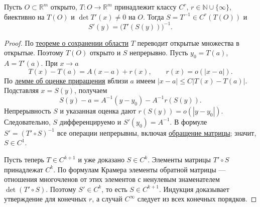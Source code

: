 \label{ticket:16}

\begin{theorem}
Пусть $O\subset\mathbb R^m$ открыто, $T:O\to\mathbb R^m$ принадлежит классу $C^r$, $r\in\mathbb N\cup\{\infty\}$, биективно на $T(O)$ и $\det T'(x)\ne0$ на $O$.
Тогда $S=T^{-1}\in C^r(T(O))$ и
\[
  S'(y)=\bigl(T'(S(y))\bigr)^{-1}.
\]
\end{theorem}

\begin{proof}
По \hyperref[ticket:14]{теореме о сохранении области} $T$ переводит открытые множества в открытые.
Поэтому $T(O)$ открыто и $S$ непрерывно.
Пусть $y_0=T(a)$, $A=T'(a)$.
При $x\to a$
\[
  T(x)-T(a)=A(x-a)+r(x),\qquad r(x)=o(|x-a|).
\]
По \hyperref[ticket:13]{лемме об оценке приращения} вблизи $a$ имеем $|x-a|\le C|T(x)-T(a)|$.
Подставляя $x=S(y)$, получаем
\[
  S(y)-a=A^{-1}(y-y_0)-A^{-1}r(S(y)).
\]
Непрерывность $S$ и указанная оценка дают $r(S(y))=o(|y-y_0|)$.
Следовательно, $S$ дифференцируемо и $S'(y_0)=A^{-1}$.
В формуле $S'=(T'\circ S)^{-1}$ все операции непрерывны, включая \hyperref[ticket:08]{обращение матрицы}; значит, $S\in C^1$.

Пусть теперь $T\in C^{k+1}$ и уже доказано $S\in C^k$.
Элементы матрицы $T'\circ S$ принадлежат $C^k$.
По формулам Крамера элементы обратной матрицы --- отношения многочленов от этих элементов с ненулевым знаменателем $\det(T'\circ S)$.
Поэтому $S'\in C^k$, то есть $S\in C^{k+1}$.
Индукция доказывает утверждение для конечных $r$, а случай $C^\infty$ следует из всех конечных порядков.
\end{proof}
